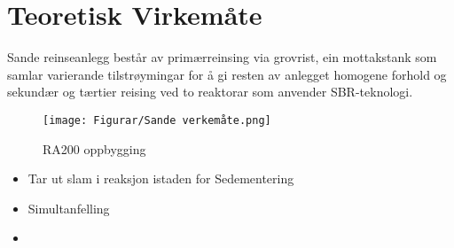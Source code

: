 \newpage
\section{Teoretisk Virkemåte}

Sande reinseanlegg består av primærreinsing via grovrist, ein mottakstank 
som samlar varierande tilstrøymingar for å gi resten av anlegget homogene forhold og
sekundær og tærtier reising ved to reaktorar som anvender SBR-teknologi.

\begin{figure}[htbp]
    \centering
    \texttt{[image: Figurar/Sande verkemåte.png]}
    \caption{RA200 oppbygging}\label{fig:HMI}
\end{figure}

\begin{itemize}
    \item Tar ut slam i reaksjon istaden for Sedementering
    \item Simultanfelling
    \item 
\end{itemize}

\thispagestyle{fancy}
